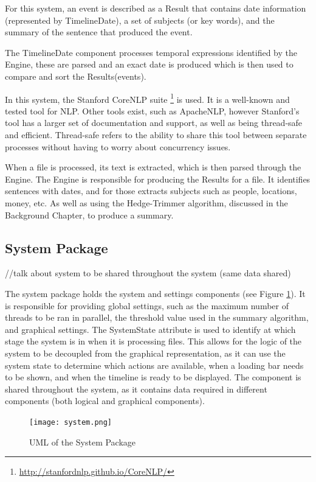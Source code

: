\par For this system, an event is described as a Result that contains date information (represented by TimelineDate), a set of subjects (or key words), and the summary of the sentence that produced the event.
\par The TimelineDate component processes temporal expressions identified by the Engine, these are parsed and an exact date is produced which is then used to compare and sort the Results(events).
\par In this system, the Stanford CoreNLP suite \footnote{\url{http://stanfordnlp.github.io/CoreNLP/}} is used. It is a well-known and tested tool for NLP. Other tools exist, such as ApacheNLP, however Stanford's tool has a larger set of documentation and support, as well as being thread-safe and efficient. Thread-safe refers to the ability to share this tool between separate processes without having to worry about concurrency issues. 
\par When a file is processed, its text is extracted, which is then parsed through the Engine. The Engine is responsible for producing the Results for a file. It identifies sentences with dates, and for those extracts subjects such as people, locations, money, etc. As well as using the Hedge-Trimmer algorithm, discussed in the Background Chapter, to produce a summary.

\subsection{System Package}
//talk about system to be shared throughout the system (same data shared)
\par The system package holds the system and settings components (see Figure \ref{fig:system}). It is responsible for providing global settings, such as the maximum number of threads to be ran in parallel, the threshold value used in the summary algorithm, and graphical settings. The SystemState attribute is used to identify at which stage the system is in when it is processing files. This allows for the logic of the system to be decoupled from the graphical representation, as it can use the system state to determine which actions are available, when a loading bar needs to be shown, and when the timeline is ready to be displayed. The component is shared throughout the system, as it contains data required in different components (both logical and graphical components).
\begin{figure}[H]
\caption{UML of the System Package}
\label{fig:system}
\texttt{[image: system.png]}
\centering
\end{figure}

